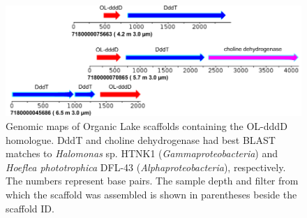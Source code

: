 \begin{figure}
\includegraphics[width=\textwidth]{orglake_figures/OLdddD_scaffolds.pdf}
\caption[Maps of OL-dddD-containing scaffolds]{Genomic maps of Organic Lake scaffolds containing the OL-dddD homologue. DddT and choline dehydrogenase had best \ac{BLAST} matches to \emph{Halomonas} sp. HTNK1 (\emph{Gammaproteobacteria}) and \emph{Hoeflea phototrophica} DFL-43 (\emph{Alphaproteobacteria}), respectively. The numbers represent base pairs. The sample depth and filter from which the scaffold was assembled is shown in parentheses beside the scaffold ID.}
\label{fig:OLdddD_scaffolds}

\end{figure}
